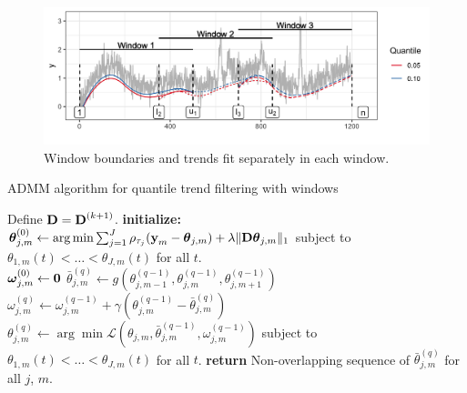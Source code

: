 \documentclass[12pt]{article}
\newcommand{\V}[1]{{\bm{\mathbf{\MakeLowercase{#1}}}}} %
\newcommand{\Vn}[2]{\V{#1}^{(#2)}} %
\newcommand{\M}[1]{{\bm{\mathbf{\MakeUppercase{#1}}}}} %
\newcommand{\Mn}[2]{\M{#1}^{(#2)}} %
\begin{document}
	\begin{figure}[!h] 
		\centering
		\includegraphics[width = 0.8\linewidth]{Figures/overlapping_windows.png}
		\caption{Window boundaries and trends fit separately in each window.}		
		\label{fig:windows}
	\end{figure}

	\begin{algorithm}
		\caption{ADMM algorithm for quantile trend filtering with windows}\label{euclid}
		\begin{algorithmic}		
			\State Define $\M{D} = \Mn{D}{k+1}$. 
			\State \textbf{initialize:} \\
				 $\Vn{\theta}{0}_{j,m} \gets \arg \min \sum_{j=1}^J\rho_{\tau_j}(\V{y}_m - \V{\theta}_{j,m})+\lambda \lVert \M{D}\V{\theta}_{j,m}\rVert_1$ subject to $\theta_{1,m}(t) < \ldots<\theta_{J,m}(t)$ for all $t$. \\		
			 	 $\Vn{\omega}{0}_{j,m} \gets \V{0}$	
			\Repeat{}
			\State  		
			$\bar{\theta}_{j,m}^{(q)} \gets g(\theta_{j, m-1}^{(q-1)}, \theta_{j,m}^{(q-1)}, \theta_{j,m+1}^{(q-1)})$
			\State 
			$\omega_{j,m}^{(q)} \gets \omega_{j,m}^{(q-1)} + \gamma(\theta_{j,m}^{(q-1)} - \bar{\theta}_{j,m}^{(q)})$	
			\State
				$\theta_{j,m}^{(q)} \gets \arg\min \mathcal{L}(\theta_{j,m}, \bar{\theta}_{j,m}^{(q-1)}, \omega_{j,m}^{(q-1)})$			
			 subject to $\theta_{1,m}(t) < \ldots<\theta_{J,m}(t)$ for all $t$.
			\State \textbf{return} Non-overlapping sequence of $\bar{\theta}_{j,m}^{(q)}$ for all $j$, $m$.
			
		\end{algorithmic}
	\end{algorithm}
\end{document}
